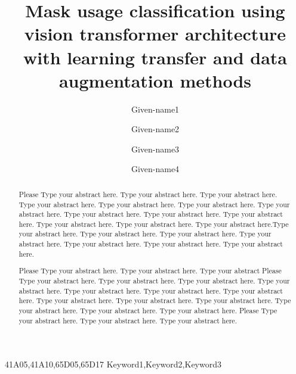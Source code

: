 \documentclass[times,onecolumn,final,longtitle]{elsarticle}
\begin{document}

\begin{frontmatter}

  \title{Mask usage classification using vision transformer
    architecture with learning transfer and data augmentation methods}%

  \author[1]{Given-name1 }
  \author[1]{Given-name2 }
  \author[2]{Given-name3 }
  \author[2]{Given-name4 }

  \address[1]{Affiliation 1, Address, City and Postal Code, Country}
  \address[2]{Affiliation 2, Address, City and Postal Code, Country}



  \begin{abstract}
    Please Type your abstract here. Type your abstract here. Type your abstract
    here. Type your abstract here. Type your abstract here. Type your
    abstract here. Type your abstract here. Type your abstract here. Type
    your abstract here. Type your abstract here. Type your abstract here.
    Type your abstract here. Type your abstract here.Type your abstract here.
    Type your abstract here. Type your abstract here. Type your abstract here.
    Type your abstract here. Type your abstract here. Type your abstract here.

    Please Type your abstract here. Type your abstract here. Type your abstract
    Please Type your abstract here. Type your abstract here. Type your abstract
    here. Type your abstract here. Type your abstract here. Type your
    abstract here. Type your abstract here. Type your abstract here. Type
    your abstract here. Type your abstract here. Type your abstract here.
    Type your abstract here. Type your abstract here.
    Please Type your abstract here. Type your abstract here.
    Type your abstract here.
  \end{abstract}

  \begin{keyword}
    \MSC 41A05\sep 41A10\sep 65D05\sep 65D17
    \KWD Keyword1\sep Keyword2\sep Keyword3
  \end{keyword}

\end{frontmatter}
\end{document}

